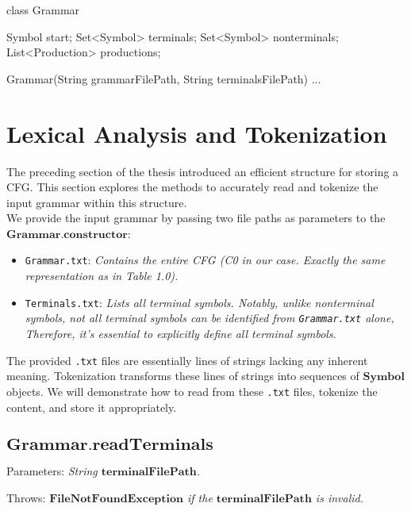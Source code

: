 \begin{codeblock}
    class Grammar {
        Symbol start;
        Set<Symbol> terminals;
        Set<Symbol> nonterminals;
        List<Production> productions;

        Grammar(String grammarFilePath, String terminalsFilePath) {}
        ...
    }
\end{codeblock}

\newpage


\section{Lexical Analysis and Tokenization}\label{sec:Lexical Analysis and Tokenization}

The preceding section of the thesis introduced an efficient structure for storing a CFG. This section explores the methods to accurately read and tokenize the input grammar within this structure.\\

We provide the input grammar by passing two file paths as parameters to the \(\boldsymbol{Grammar.constructor}\):
\begin{itemize}
    \item  \texttt{Grammar.txt}: \textit{Contains the entire CFG (C0 in our case. Exactly the same representation as in Table 1.0).}
    \item  \texttt{Terminals.txt}: \textit{Lists all terminal symbols. Notably, unlike nonterminal symbols, not all terminal symbols can be identified from \texttt{Grammar.txt} alone, Therefore, it’s essential to explicitly define all terminal symbols.}
\end{itemize}

The provided \texttt{.txt} files are essentially lines of strings lacking any inherent meaning. Tokenization transforms these lines of strings into sequences of \(\boldsymbol{Symbol}\) objects. We will demonstrate how to read from these \texttt{.txt} files, tokenize the content, and store it appropriately.

\subsection*{\(\boldsymbol{Grammar.readTerminals}\)}

Parameters: \textit{String \(\boldsymbol{terminalFilePath}\).}

Throws: \textit{\(\boldsymbol{FileNotFoundException}\) if the \(\boldsymbol{terminalFilePath}\) is invalid.}

